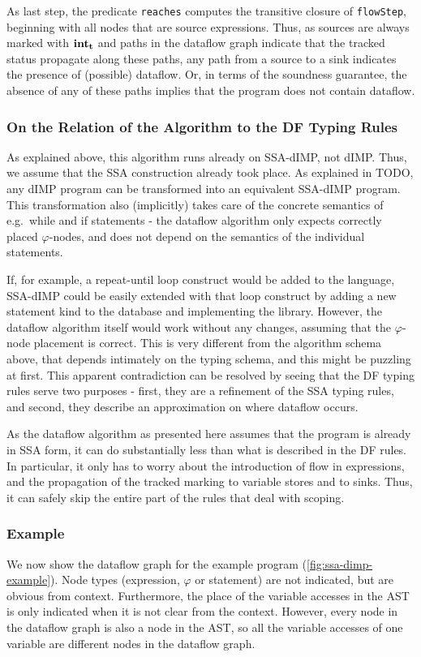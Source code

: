 As last step, the predicate \texttt{reaches}
computes the transitive closure of \texttt{flowStep}, beginning with all nodes
that are source expressions.
Thus, as sources are always marked with $\textbf{int}_\textbf{t}$ and paths in the dataflow
graph indicate that the tracked status propagate along these paths, any path 
from a source to a sink indicates the presence of (possible) dataflow.
Or, in terms of the soundness guarantee, the absence of any of these paths 
implies that the program does not contain dataflow.

\subsubsection*{On the Relation of the Algorithm to the DF Typing Rules}
As explained above, this algorithm runs already on SSA-dIMP, not dIMP.
Thus, we assume that the SSA construction already took place.
As explained in TODO, any dIMP program can be transformed into an equivalent
SSA-dIMP program.
This transformation also (implicitly) takes care of the concrete semantics of e.g.\ 
while and if statements - the dataflow algorithm only expects correctly placed $\varphi$-nodes,
and does not depend on the semantics of the individual statements.

If, for example, a repeat-until loop construct would be added to the language,
SSA-dIMP could be easily extended with that loop construct by adding a new statement 
kind to the database and implementing the library.
However, the dataflow algorithm itself would work without any changes, assuming that
the $\varphi$-node placement is correct.
This is very different from the algorithm schema above, that depends intimately on the 
typing schema, and this might be puzzling at first.
This apparent contradiction can be resolved by seeing that the DF typing 
rules serve two purposes - first, they are a refinement of the SSA typing rules,
and second, they describe an approximation on where dataflow occurs.

As the dataflow algorithm as presented here assumes that the program is already in 
SSA form, it can do substantially less than what is described in the DF rules.
In particular, it only has to worry about the introduction of flow in expressions,
and the propagation of the tracked marking to variable stores and to sinks.
Thus, it can safely skip the entire part of the rules that deal with scoping.

\subsubsection*{Example}
We now show the dataflow graph for the example program (\autoref{fig:ssa-dimp-example}).
Node types (expression, $\varphi$ or statement) are not indicated, but are obvious from context.
Furthermore, the place of the variable accesses in the AST is only indicated when it is 
not clear from the context.
However, every node in the dataflow graph is also a node in the AST, so all the variable accesses
of one variable are different nodes in the dataflow graph.

